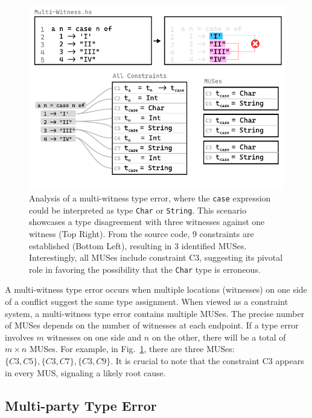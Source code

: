 \begin{figure}[hbt]
    \centering
\includegraphics[width=\linewidth]{Multi-Witness-MUS}
  \caption[Illustration of a multi-witness type error in the context of MUSes]{\label{fig:multi-witness-2}
  Analysis of a multi-witness type error, where the \texttt{case} expression could be interpreted as type \texttt{Char} or \texttt{String}. This scenario showcases a type disagreement with three witnesses against one witness (Top Right). From the source code, 9 constraints are established (Bottom Left), resulting in 3 identified MUSes. Interestingly, all MUSes include constraint C3, suggesting its pivotal role in favoring the possibility that the \texttt{Char} type is erroneous.}
  \end{figure}

A multi-witness type error occurs when multiple locations (witnesses) on one side of a conflict suggest the same type assignment. When viewed as a constraint system, a multi-witness type error contains multiple MUSes. The precise number of MUSes depends on the number of witnesses at each endpoint. If a type error involves $m$ witnesses on one side and $n$ on the other, there will be a total of $m \times n$ MUSes. For example, in Fig.~\ref{fig:multi-witness-2}, there are three MUSes: $\{C3, C5\}, \{C3, C7\}, \{C3, C9\}$. It is crucial to note that the constraint C3 appears in every MUS, signaling a likely root cause.

\subsection*{Multi-party Type Error}

